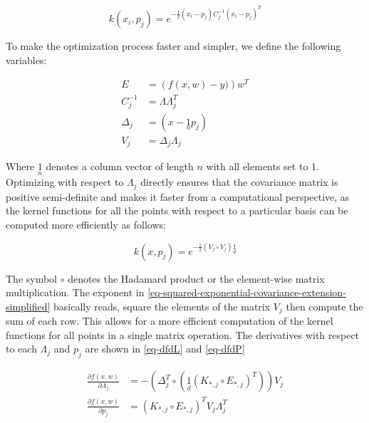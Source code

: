 \documentclass[useAMS,usenatbib,fleqn]{mn2e}
\begin{document}
\begin{equation}
\label{eq-squared-exponential-covariance-extension}
k(x_{i},p_{j}) = e^{-\frac{1}{2}\left(x_{i}-p_{j}\right)C_{j}^{-1}\left(x_{i}-p_{j}\right)^{T}}
\end{equation}

To make the optimization process faster and simpler, we define the following variables:

\begin{subequations}
\begin{align} 
\label{eq-error}
E &= \left(f(x,w)-y)\right)w^{T}\\
\label{eq-Cinv}
C_{j}^{-1} &= \Lambda\Lambda_{j}^{T}\\
\label{eq-Delta_j}
\Delta_{j} &= \left(x-\underset{n}{1}p_{j}\right)\\
\label{eq-V_j}
V_{j} &= \Delta_{j}\Lambda_{j}
\end{align}
\end{subequations}

Where $\underset{n}{1}$ denotes a column vector of length $n$ with all elements set to 1. Optimizing with respect to $\Lambda_{j}$ directly ensures that the covariance matrix is positive semi-definite and makes it faster from a computational perspective, as the kernel functions for all the points with respect to a particular basis can be computed more efficiently as follows:

\begin{equation}
\label{eq-squared-exponential-covariance-extension-simplified}
k(x,p_{j}) = e^{-\frac{1}{2}\left(V_{j}\circ V_{j}\right)\underset{d}{1}}
\end{equation}

The symbol $\circ$ denotes the Hadamard product or the element-wise matrix multiplication. The exponent in \eqref{eq-squared-exponential-covariance-extension-simplified} basically reads, square the elements of the matrix $V_{j}$ then compute the sum of each row. This allows for a more efficient computation of the kernel functions for all points in a single matrix operation. The derivatives with respect to each $\Lambda_{j}$ and $p_{j}$ are shown in \eqref{eq-dfdL} and \eqref{eq-dfdP}

\begin{subequations}
\begin{align} 
\label{eq-dfdL}
\frac{\partial f(x,w)}{\partial \Lambda_{j}} &= -\left( \Delta_{j}^{T}\circ \left(\underset{d}{1}\left(K_{*,j}\circ E_{*,j}\right)^{T}\right) \right)V_{j}\\
\label{eq-dfdP}
\frac{\partial f(x,w)}{\partial p_{j}} &= \left( K_{*,j}\circ E_{*,j} \right)^{T}V_{j}\Lambda_{j}^{T}
\end{align}
\end{subequations}
\end{document}
